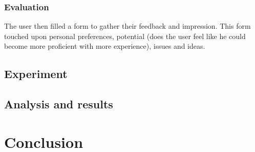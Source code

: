 \documentclass[12pt, a4paper, twoside]{article}
\begin{document}
\subsubsection{Evaluation}
The user then filled a form to gather their feedback and impression. This form touched upon personal preferences, potential (does the user feel like he could become more proficient with more experience), issues and ideas. 

\subsection{Experiment}

\subsection{Analysis and results}

\section{Conclusion}
 
\end{document}
